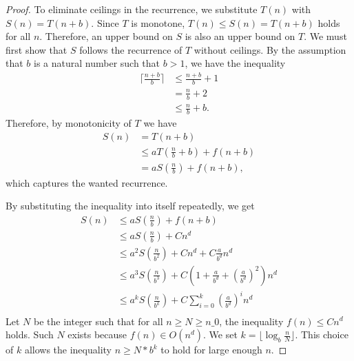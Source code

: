 \begin{proof}
    \leanok
    To eliminate ceilings in the recurrence, we substitute $T(n)$ with 
    $S(n) = T(n+b)$. Since $T$ is monotone, $T(n) \leq S(n) = T(n+b)$ holds 
    for all $n$. Therefore, an upper bound on $S$ is also an upper bound on 
    $T$. We must first show that $S$ follows the recurrence of $T$ without 
    ceilings. By the assumption that $b$ is a natural number such that $b > 1$, 
    we have the inequality 
    \begin{align*}
        \lceil \frac{n+b}{b} \rceil &\leq \frac{n+b}{b} + 1 \\
                                    &=    \frac{n}{b} + 2 \\
                                    &\leq \frac{n}{b} + b.
    \end{align*}
    Therefore, by monotonicity of $T$ we have 
    \begin{align*} 
        S(n)  &= T(n+b) \\
              &\leq a T(\frac{n}{b} + b) + f(n+b) \\
              &= a S(\frac{n}{b}) + f(n+b),
    \end{align*}
    which captures the wanted recurrence.

    By substituting the inequality into itself repeatedly, we get
    \begin{align}
        \label{eq:s_rec}
        S(n) &\leq a S(\frac{n}{b}) + f(n + b) \\
             &\leq a S(\frac{n}{b}) + C n^d \\
             &\leq a^2 S(\frac{n}{b^2}) + C n^d + C \frac{a}{b^d} n^d \\
             &\leq a^3 S(\frac{n}{b^3}) + C (1 + \frac{a}{b^d} + 
                                            (\frac{a}{b^d})^2) n^d \\
             &\leq a^k S(\frac{n}{b^k}) + C \sum_{i=0}^k 
                                                    (\frac{a}{b^d})^i n^d \\
    \end{align}
    Let $N$ be the integer such that for all $n \geq N \geq n\_0$, the 
    inequality $f(n) \leq C n^d$ holds. Such $N$ exists because 
    $f(n) \in O(n^d)$. We set $k = \lfloor \log_b{\frac{n}{N}} \rfloor$. 
    This choice of $k$ allows the inequality $n \geq N * b^k$ to hold for 
    large enough $n$. 


\end{proof}

